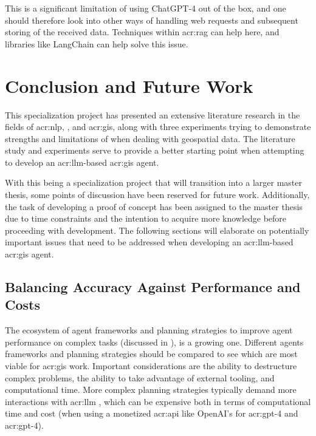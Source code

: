 This is a significant limitation of using ChatGPT-4 out of the box, and one should therefore look into other ways of handling web requests and subsequent storing of the received data. Techniques within \gls{acr:rag} can help here, and libraries like LangChain can help solve this issue.



\section{Conclusion and Future Work}\label{sec:conclusion-and-future-work}

This specialization project has presented an extensive literature research in the fields of \acrlong{acr:nlp}, , and \acrlong{acr:gis}, along with three experiments trying to demonstrate strengths and limitations of  when dealing with geospatial data. The literature study and experiments serve to provide a better starting point when attempting to develop an \acrshort{acr:llm}-based \acrshort{acr:gis} agent.

With this being a specialization project that will transition into a larger master thesis, some points of discussion have been reserved for future work. Additionally, the task of developing a proof of concept has been assigned to the master thesis due to time constraints and the intention to acquire more knowledge before proceeding with development. The following sections will elaborate on potentially important issues that need to be addressed when developing an \acrshort{acr:llm}-based \acrshort{acr:gis} agent.

\subsection{Balancing Accuracy Against Performance and Costs}

The ecosystem of agent frameworks and planning strategies to improve agent performance on complex tasks (discussed in ), is a growing one. Different agents frameworks and planning strategies should be compared to see which are most viable for \acrshort{acr:gis} work. Important considerations are the ability to destructure complex problems, the ability to take advantage of external tooling, and computational time. More complex planning strategies typically demand more interactions with \acrshort{acr:llm} , which can be expensive both in terms of computational time and cost (when using a monetized \acrshort{acr:api} like OpenAI's for \acrshort{acr:gpt}-4 and \acrshort{acr:gpt}-4).

